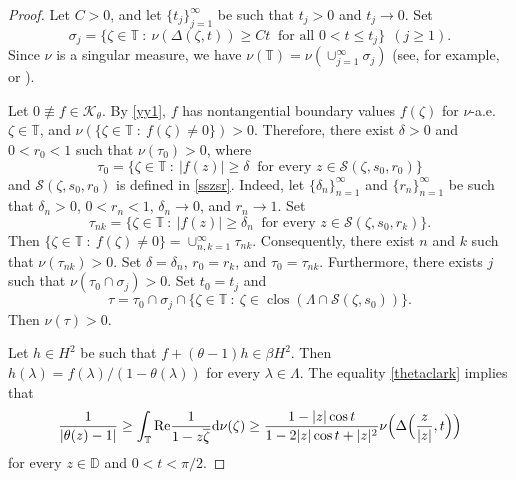 \documentclass[a4paper,oneside,11pt]{amsart}
\numberwithin{equation}{section}
\theoremstyle{plain}
\theoremstyle{definition}
\begin{document}
\begin{proof} Let $C>0$,  and let $\{t_j\}_{j=1}^\infty$ be such that $t_j>0$ and $t_j\to 0$. Set 
\begin{equation*}\sigma_j=\{\zeta\in\mathbb T\ : \ \nu(\Delta(\zeta, t))\geq Ct \ \text{ for all } 0<t\leq t_j\}\ \ (j\geq 1).
\end{equation*}
Since $\nu$ is a singular measure, we have $\nu(\mathbb T)=\nu(\cup_{j=1}^\infty\sigma_j)$ 
(see, for example, {\cite[Theorem 1.2]{gmr}} or  {\cite[formula (II.6.3)]{garnett}}).

Let $0\not\equiv f\in\mathcal K_\theta$. 
By \eqref{yy1}, 
$f$ has nontangential boundary values $f(\zeta)$ for $\nu$-a.e. $\zeta\in\mathbb T$, and 
$\nu(\{\zeta\in\mathbb T\ :\ f(\zeta)\neq 0\})>0$. Therefore, there exist $\delta>0$ and $0<r_0<1$ such that 
$\nu(\tau_0)>0$, where
\begin{equation*}\tau_0=\{\zeta\in\mathbb T\ : \ |f(z)|\geq\delta \ \text{ for every } z\in \mathcal S(\zeta,s_0,r_0)\}
\end{equation*}
and  $\mathcal S(\zeta,s_0,r_0)$ is defined in \eqref{sszsr}.
Indeed, let $\{\delta_n\}_{n=1}^\infty$ and $\{r_n\}_{n=1}^\infty$ be such that $\delta_n>0$, $0<r_n<1$,  
$\delta_n\to 0$, 
and $r_n\to 1$. Set 
\begin{equation*}\tau_{nk}=\{\zeta\in\mathbb T\ : \ |f(z)|\geq\delta_n \ \text{ for every } z\in \mathcal S(\zeta,s_0,r_k)\}.
\end{equation*}
Then $\{\zeta\in\mathbb T\ :\ f(\zeta)\neq 0\}=\cup_{n,k=1}^\infty \tau_{nk}$. Consequently, there exist $n$ and $k$ such that 
$\nu(\tau_{nk})>0$. Set $\delta=\delta_n$, $r_0=r_k$, and $\tau_0=\tau_{nk}$. Furthermore, there exists $j$ such that 
$\nu(\tau_0\cap\sigma_j)>0$. Set $t_0=t_j$ and 
\begin{equation*}\tau=\tau_0\cap\sigma_j\cap
\{\zeta\in\mathbb T\ :\ \zeta\in\operatorname{clos}(\Lambda\cap\mathcal S(\zeta,s_0))\}.\end{equation*} 
Then $\nu(\tau)>0$.

Let $h\in H^2$ be such that $f+(\theta-1)h\in\beta H^2$. Then $h(\lambda)=f(\lambda)/(1-\theta(\lambda))$ for every $\lambda\in\Lambda$.
The equality \eqref{thetaclark} implies that 
\begin{equation*} \frac{1}{|\theta(z)-1|}\geq\int_{\mathbb T}\mathrm{Re}\frac{1}{1-z\overline\zeta}\mathrm{d}\nu(\zeta)
\geq\frac{1-|z|\cos t}{1-2|z|\cos t+|z|^2}\nu\Bigl(\Delta\Bigl(\frac{z}{|z|}, t\Bigr)\Bigr)\end{equation*}
for every $z\in\mathbb D$ and $0<t<\pi/2$.


\end{proof}
\end{document}
